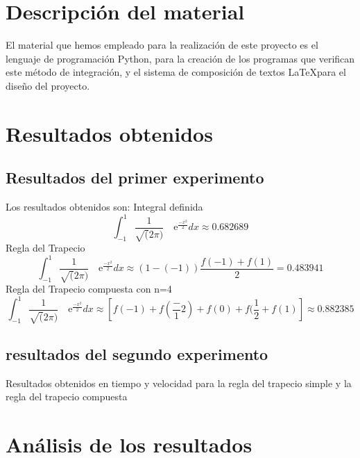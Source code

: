 \section{Descripción del material}
\label{3:sec:2}
\parindent=1cm
\raggedright
El material que hemos empleado para la realización de este proyecto es el lenguaje de
programación Python, para la creación de los programas que verifican este método de integración, 
y el sistema de composición de textos \LaTeX para el diseño del proyecto.


\section{Resultados obtenidos}
\label{3:sec:3}
\parindent=1cm
\raggedright
\subsection{Resultados del primer experimento}
Los resultados obtenidos son:
Integral definida 
\[
\int_{-1}^{1} \frac{1}{\sqrt(2\pi)} \quad\text{e}^{\frac{-x^2}{2}}dx\approx0.682689 
\]
Regla del Trapecio
\[
\int_{-1}^{1} \frac{1}{\sqrt(2\pi)} \quad\text{e}^{\frac{-x^2}{2}}dx\approx\left(1-(-1)\right)\frac{f(-1)+f(1)}{2}=0.483941
\]
Regla del Trapecio compuesta con n=4
\[
\int_{-1}^{1} \frac{1}{\sqrt(2\pi)} \quad\text{e}^{\frac{-x^2}{2}}dx\approx\left[f(-1) + f(\frac-{1}{2}) + f(0) + f(\frac{1}{2} + f(1)\right]\approx0.882385
\]
\subsection{resultados del segundo experimento}

Resultados obtenidos en tiempo y velocidad para la regla del trapecio simple y la regla del trapecio compuesta


\section{Análisis de los resultados}
\label{3:sec:4}
\parindent=1cm
\raggedright
 
